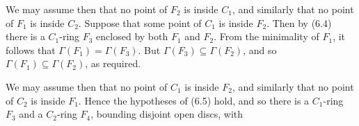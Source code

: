 We may assume then that no point of $F_2$ is inside $C_1$, and similarly that no point of $F_1$ is inside $C_2$. Suppose that some point of $C_1$ is inside $F_2$. Then by (6.4) there is a $C_1$-ring $F_3$ enclosed by both $F_1$ and $F_2$. From the minimality of $F_1$, it follows that $\Gamma(F_1) = \Gamma(F_3)$. But $\Gamma(F_3) \subseteq \Gamma(F_2)$, and so $\Gamma(F_1) \subseteq \Gamma(F_2)$, as required.

We may assume then that no point of $C_1$ is inside $F_2$, and similarly that no point of $C_2$ is inside $F_1$. Hence the hypotheses of (6.5) hold, and so there is a $C_1$-ring $F_3$ and a $C_2$-ring $F_4$, bounding disjoint open discs, with
